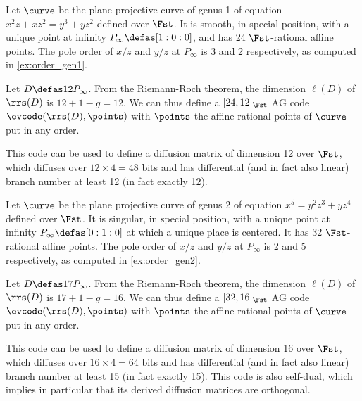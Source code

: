 \begin{example}
\label{ex:genus1}
Let $\curve$ be the plane projective curve of genus 1 of equation $x^2z + xz^2 = y^3 + yz^2$ defined over $\Fst$. It is smooth, in special position,
with a unique point at infinity $P_\infty \defas [1:0:0]$, and has 24 $\Fst$-rational affine points. The pole order
of $x/z$ and $y/z$ at $P_\infty$ is 3 and 2 respectively, as computed in \autoref{ex:order_gen1}.

Let $D \defas 12P_\infty$. From the Riemann-Roch theorem, the dimension $\ell(D)$ of $\rrs(D)$ is $12 + 1 - g = 12$. We can thus
define a $[24, 12]_{\Fst}$ AG code $\evcode(\rrs(D), \points)$ with $\points$ the affine rational points of $\curve$
put in any order.

This code can be used to define a diffusion matrix of dimension 12 over $\Fst$, which diffuses over $12\times 4 = 48$ bits and
has differential (and in fact also linear) branch number at least 12 (in fact exactly 12). 
\end{example}

\begin{example}
\label{ex:genus2}
Let $\curve$ be the plane projective curve of genus 2 of equation $x^5 = y^2z^3 + yz^4$ defined over $\Fst$. It is singular, in special position,
with a unique point at infinity $P_\infty \defas [0:1:0]$ at which a unique place is centered. It has 32 $\Fst$-rational affine points. The pole order
of $x/z$ and $y/z$ at $P_\infty$ is 2 and 5 respectively, as computed in \autoref{ex:order_gen2}.

Let $D \defas 17P_\infty$. From the Riemann-Roch theorem, the dimension $\ell(D)$ of $\rrs(D)$ is $17 + 1 - g = 16$. We can thus
define a $[32, 16]_{\Fst}$ AG code $\evcode(\rrs(D), \points)$ with $\points$ the affine rational points of $\curve$
put in any order.

This code can be used to define a diffusion matrix of dimension 16 over $\Fst$, which diffuses over $16\times 4 = 64$ bits and
has differential (and in fact also linear) branch number at least 15 (in fact exactly 15). This code is also self-dual,
which implies in particular that its derived diffusion matrices are orthogonal.
\end{example}
